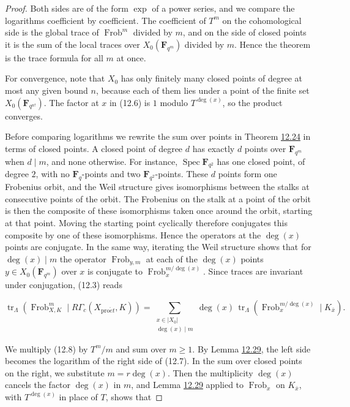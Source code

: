 \documentclass[11pt]{article}
\begin{document}
\begin{proof}[{Proof}]\label{bp93}%
Both sides are of the form \(\exp\) of a power series, and we compare the logarithms coefficient by coefficient. The coefficient of \(T^m\) on the cohomological side is the global trace of \(\operatorname{Frob}^m\) divided by \(m\), and on the side of closed points it is the sum of the local traces over \(X_0(\mathbf F_{q^m})\) divided by \(m\). Hence the theorem is the trace formula for all \(m\) at once.

For convergence, note that \(X_0\) has only finitely many closed points of degree at most any given bound \(n\), because each of them lies under a point of the finite set \(X_0(\mathbf F_{q^{n!}})\). The factor at \(x\) in (12.6) is \(1\) modulo \(T^{\deg(x)}\), so the product converges.

Before comparing logarithms we rewrite the sum over points in Theorem \hyperref[bp73]{12.24} in terms of closed points. A closed point of degree \(d\) has exactly \(d\) points over \(\mathbf F_{q^m}\) when \(d\mid m\), and none otherwise. For instance, \(\operatorname{Spec}\mathbf F_{q^2}\) has one closed point, of degree \(2\), with no \(\mathbf F_q\)-points and two \(\mathbf F_{q^2}\)-points. These \(d\) points form one Frobenius orbit, and the Weil structure gives isomorphisms between the stalks at consecutive points of the orbit. The Frobenius on the stalk at a point of the orbit is then the composite of these isomorphisms taken once around the orbit, starting at that point. Moving the starting point cyclically therefore conjugates this composite by one of these isomorphisms. Hence the operators at the \(\deg(x)\) points are conjugate. In the same way, iterating the Weil structure shows that for \(\deg(x)\mid m\) the operator \(\operatorname{Frob}_{y,m}\) at each of the \(\deg(x)\) points \(y\in X_0(\mathbf F_{q^m})\) over \(x\) is conjugate to \(\operatorname{Frob}_x^{m/\deg(x)}\). Since traces are invariant under conjugation, (12.3) reads

\[
\operatorname{tr}_{\Lambda}(\operatorname{Frob}_{X,K}^m\mid R\Gamma_c(X_{\mathrm{pro}\acute{e}t},K))
=\sum_{\substack{x\in|X_0|\\\deg(x)\mid m}}\deg(x)\,
\operatorname{tr}_{\Lambda}
(\operatorname{Frob}_x^{m/\deg(x)}\mid K_{\bar x}).
\tag{12.8}
\]

We multiply (12.8) by \(T^m/m\) and sum over \(m\geq1\). By Lemma \hyperref[bp89]{12.29}, the left side becomes the logarithm of the right side of (12.7). In the sum over closed points on the right, we substitute \(m=r\deg(x)\). Then the multiplicity \(\deg(x)\) cancels the factor \(\deg(x)\) in \(m\), and Lemma \hyperref[bp89]{12.29} applied to \(\operatorname{Frob}_x\) on \(K_{\bar x}\), with \(T^{\deg(x)}\) in place of \(T\), shows that


\end{proof}
\end{document}
